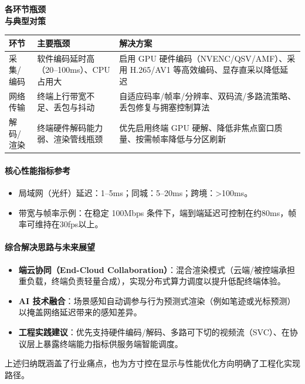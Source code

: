 \documentclass[12pt,a4paper]{article}
\begin{document}
\noindent\textbf{各环节瓶颈\\与典型对策}\par
\begin{tabular}{>{\raggedright\arraybackslash}p{3.5cm} >{\raggedright\arraybackslash}p{6.5cm} >{\raggedright\arraybackslash}p{5cm}}
\toprule
环节 & 主要瓶颈 & 解决方案 \\
\midrule
采集/编码 & 软件编码延时高（20--100ms）、CPU 占用大 & 启用 GPU 硬件编码（NVENC/QSV/AMF）、采用 H.265/AV1 等高效编码、显存直采以降低延迟 \\
网络传输 & 终端上行带宽不足、丢包与抖动 & 自适应码率/帧率/分辨率、双码流/多路流策略、丢包修复与拥塞控制算法 \\
解码/渲染 & 终端硬件解码能力弱、渲染管线瓶颈 & 优先启用终端 GPU 硬解、降低非焦点窗口质量、按需帧率降低与分区刷新 \\
\bottomrule
\end{tabular}

\paragraph{核心性能指标参考}
\begin{itemize}[noitemsep]
  \item 局域网（光纤）延迟：1--5ms；同城：5--20ms；跨境：>100ms。
  \item 带宽与帧率示例：在稳定 100Mbps 条件下，端到端延迟可控制在约80ms，帧率可维持在30fps以上。
\end{itemize}

\paragraph{综合解决思路与未来展望}
\begin{itemize}[noitemsep]
  \item \textbf{端云协同（End-Cloud Collaboration）}：混合渲染模式（云端/被控端承担重负载，终端负责轻量合成），实现分布式算力调度以提升低配终端体验。
  \item \textbf{AI 技术融合}：场景感知自动调参与行为预测式渲染（例如笔迹或光标预测）以掩盖网络延迟带来的感知差异。
  \item \textbf{工程实践建议}：优先支持硬件编码/解码、多路可下切的视频流（SVC）、在协议层上暴露终端能力指标供服务端智能调度。
\end{itemize}

上述归纳既涵盖了行业痛点，也为方寸控在显示与性能优化方向明确了工程化实现路径。

\vspace{6pt}
\end{document}
